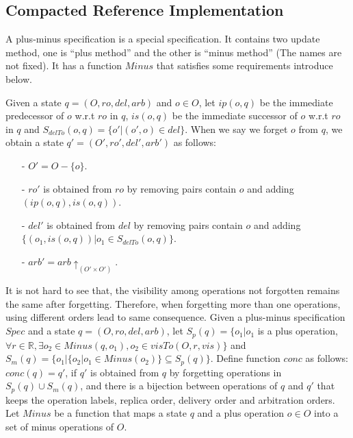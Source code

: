 \subsection{Compacted Reference Implementation}
\label{subsec:compacted reference implementation}

A plus-minus specification is a special specification. It contains two update method, one is ``plus method'' and the other is ``minus method'' (The names are not fixed). It has a function $Minus$ that satisfies some requirements introduce below.

Given a state $q=(O,\mathit{ro},\mathit{del},\mathit{arb})$ and $o \in O$, let $ip(o,q)$ be the immediate predecessor of $o$ w.r.t $\mathit{ro}$ in $q$, $is(o,q)$ be the immediate successor of $o$ w.r.t $\mathit{ro}$ in $q$ and $S_{delTo}(o,q) = \{o' \vert (o',o) \in \mathit{del} \}$. When we say we forget $o$ from $q$, we obtain a state $q'=(O',\mathit{ro}',\mathit{del}',\mathit{arb}')$ as follows:

\begin{itemize}
\setlength{\itemsep}{0.5pt}
\item[-] $O' = O - \{ o \}$.

\item[-] $\mathit{ro}'$ is obtained from $\mathit{ro}$ by removing pairs contain $o$ and adding $(ip(o,q),is(o,q))$.

\item[-] $\mathit{del}'$ is obtained from $\mathit{del}$ by removing pairs contain $o$ and adding $\{ (o_1,is(o,q)) \vert o_1 \in S_{delTo}(o,q)\}$.

\item[-] $\mathit{arb}' = \mathit{arb} \uparrow_{(O' \times O')}$.
\end{itemize}

It is not hard to see that, the visibility among operations not forgotten remains the same after forgetting. Therefore, when forgetting more than one operations, using different orders lead to same consequence. Given a plus-minus specification $Spec$ and a state $q=(O,\mathit{ro},\mathit{del},\mathit{arb})$, let $S_p(q) = \{ o_1 \vert o_1$ is a plus operation, $\forall r \in \mathbb{R}, \exists o_2 \in Minus(q,o_1), o_2 \in visTo(O,r,vis) \}$ and $S_m(q) = \{ o_1 \vert  \{ o_2 \vert o_1 \in Minus(o_2) \} \subseteq S_p(q) \}$. Define function $conc$ as follows: $conc(q) = q'$, if $q'$ is obtained from $q$ by forgetting operations in $S_p(q) \cup S_m(q)$, and there is a bijection between operations of $q$ and $q'$ that keeps the operation labels, replica order, delivery order and arbitration orders. Let $Minus$ be a function that maps a state $q$ and a plus operation $o \in O$ into a set of minus operations of $O$.

